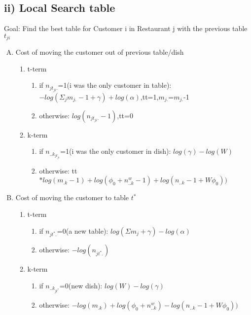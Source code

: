 \documentclass{article}
\begin{document}
\begin{spacing}{1.1}
\subsection{ii) Local Search table}
Goal: Find the best table for Customer i in Restaurant j with the previous table $t_{ji}$
\begin{enumerate}[(A)]
 \item Cost of moving the customer out of previous table/dish
\begin{enumerate}
\item t-term 
\begin{enumerate}
 \item if $n_{jt_{ji}.}$=1(i was the only customer in table): $-log(\Sigma_{j} m_{j.}-1+\gamma)+log(\alpha)$,tt=1,$m_{j.}$=$m_{j.}$-1
 \item otherwise: $log(n_{jt_{ji}.}-1)$,tt=0
\end{enumerate}
\item k-term
\begin{enumerate}
 \item if $n_{..k_{jt_{ji}}}$=1(i was the only customer in dish): $log(\gamma)-log(W)$
 \item otherwise: tt$*log(m_{.k}-1)+log(\phi_{0}+n_{..k}^{w}-1)+log(n_{..k}-1+W\phi_{0}))$
\end{enumerate}
\end{enumerate}
\item Cost of moving the customer to table $t^{*}$
\begin{enumerate}
\item t-term 
\begin{enumerate}
 \item if $n_{jt^{*}.}$=0(a new table): $log(\Sigma m_{j}+\gamma)-log(\alpha)$
 \item otherwise: $-log(n_{jt^{*}.})$
\end{enumerate}
\item k-term
\begin{enumerate}
 \item if $n_{..k_{jt^{*}}}$=0(new dish): $log(W)-log(\gamma)$
 \item otherwise: $-log(m_{.k})+log(\phi_{0}+n_{..k}^{w})-log(n_{..k}-1+W\phi_{0}))$
\end{enumerate}
\end{enumerate} 
\end{enumerate} 

\end{spacing}
\end{document}
